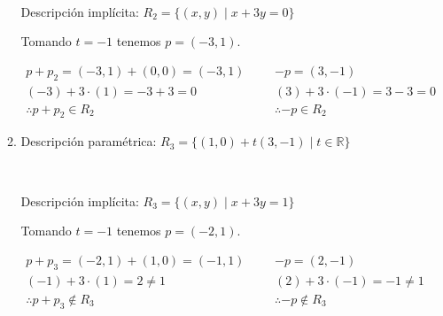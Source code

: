 \documentclass[a4paper,12pt,twoside,spanish,reqno]{amsbook}
\numberwithin{equation}{section}
\begin{document}
\begin{enumerate}[resume]
\begin{enumerate}
\

Descripción implícita: $\boxed {R_2 = \{ (x,y) \; | \; x+3y = 0 \} }$

Tomando $t=-1$ tenemos $\boxed {p = (-3,1) }$.

\begin{equation*}
\begin{array}{ll|ll}
p+p_2 = (-3,1) + (0,0) = (-3,1)	&&& -p = (3,-1) \\
(-3) + 3 \cdot (1) = -3 + 3 = 0	&&& (3) + 3 \cdot (-1) = 3 -3 = 0 \\
\therefore  p+p_2 \in R_2   		&&& \therefore  -p \in R_2
\end{array}
\end{equation*}

	\item
	
Descripción paramétrica: $\boxed {R_3 = \{ (1,0) + t(3,-1) \; | \; t \in \mathbb{R} \} }$

\

Descripción implícita: $\boxed {R_3 = \{ (x,y) \; | \; x+3y = 1 \} }$

Tomando $t=-1$ tenemos $\boxed {p = (-2,1) }$.

\begin{equation*}
\begin{array}{ll|ll}
p+p_3 = (-2,1) + (1,0) = (-1,1)	&&& -p = (2,-1) \\
(-1) + 3 \cdot (1) = 2 \neq 1		&&& (2) + 3 \cdot (-1) = -1 \neq 1 \\
\therefore  p+p_3 \notin R_3  		&&& \therefore  -p \notin R_3
\end{array}
\end{equation*}


\end{enumerate}


\end{enumerate}
\end{document}
